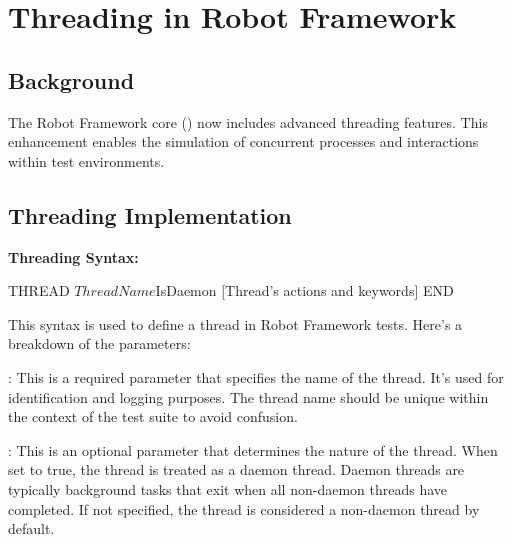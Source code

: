 %
%
%

\chapter{Threading in Robot Framework}

\section{Background}

The Robot Framework core (\rfwcore) now includes advanced threading features. This enhancement enables the simulation of concurrent processes and interactions within test environments.

\section{Threading Implementation}

\textbf{Threading Syntax:}

\begin{robotcode}
THREAD    ${ThreadName}     ${IsDaemon}
       [Thread's actions and keywords]
END
\end{robotcode}

This syntax is used to define a thread in Robot Framework tests. Here's a breakdown of the parameters:

: This is a required parameter that specifies the name of the thread. It's used for identification and logging purposes. The thread name should be unique within the context of the test suite to avoid confusion.

: This is an optional parameter that determines the nature of the thread. When set to true, the thread is treated as a daemon thread. Daemon threads are typically background tasks that exit when all non-daemon threads have completed. If not specified, the thread is considered a non-daemon thread by default.


